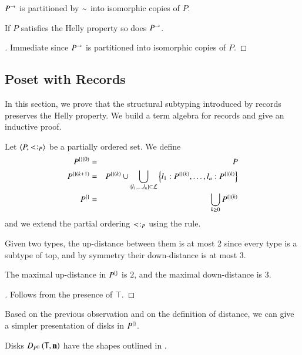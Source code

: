 \documentclass{report}
\begin{document}
  \begin{cor}
    $P^\rightarrow$ is partitioned by $\sim$ into isomorphic copies of $P$.
  \end{cor}
  \begin{thm}
    If $P$ satisfies the Helly property so does $P^\rightarrow$.
  \end{thm}
  \begin{proof}[]
    Immediate since $P^\rightarrow$ is partitioned into isomorphic copies of $P$.
  \end{proof}
  
  \subsection{Poset with Records}
  In this section, we prove that the structural subtyping introduced by records
  preserves the Helly property. We build a term algebra for records 
  and give an inductive proof.
  \begin{dfn}
    Let $\poset{P,\subtype_P}$ be a partially ordered set. We define
    \begin{eqnarray*}
      P^{{\{\}}(0)} &=& P \\
      P^{{\{\}}(k+1)} &=& P^{{\{\}}(k)}\cup
        \bigcup_{\left\{l_1,\ldots,l_n\right\}\subset\mathcal{L}}\left\{l_1:P^{{\{\}}(k)}, \ldots, l_n:P^{{\{\}}(k)}\right\} \\
      P^{\{\}} &=& \bigcup_{k\ge 0}P^{{\{\}}(k)}
    \end{eqnarray*}
    and we extend the partial ordering $\subtype_P$ using the \srec rule.
  \end{dfn}
  Given two types, the up-distance between them is at most 2 since every type
  is a subtype of top, and by symmetry their down-distance is at most 3.
  \begin{thm}
    The maximal up-distance in $P^{\{\}}$ is $2$, and the maximal down-distance is $3$.
  \end{thm}
  \begin{proof}[]
    Follows from the presence of $\top$.
  \end{proof}
  Based on the previous observation and on the definition of distance,
  we can give a simpler presentation of disks in $P^{\{\}}$.
  \begin{thm}
    Disks $D_{P^{\{\}}}\left({\textsf{T}, \mathbf{n}}\right)$ have the shapes outlined in .
  \end{thm}
\end{document}
